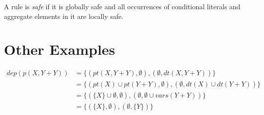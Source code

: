 \documentclass{article}
\newcommand{\set}[1]{\{#1\}}
\newcommand{\dep}[2]{\{(#1), (#2)\}}
\newcommand\Provide{\mathit{pt}}
\newcommand\Depend{\mathit{dt}}
\begin{document}
	A rule is \emph{safe} if it is globally safe and all occurrences of conditional literals and aggregate elements in it are locally safe.

	\section{Other Examples}
	\begin{align*}
		dep(p(X,Y+Y)) &= \dep{\Provide(X,Y+Y), \emptyset}{\emptyset, \Depend(X,Y+Y)}
		\\ &= \dep{\Provide(X) \cup \Provide(Y+Y), \emptyset}{\emptyset, \Depend(X) \cup \Depend(Y+Y)}
		\\ &= \dep{\set{X} \cup \emptyset, \emptyset}{\emptyset, \emptyset \cup vars(Y+Y)}
		\\ &= \dep{\set{X}, \emptyset}{\emptyset, \set{Y}}
	\end{align*}
\end{document}
